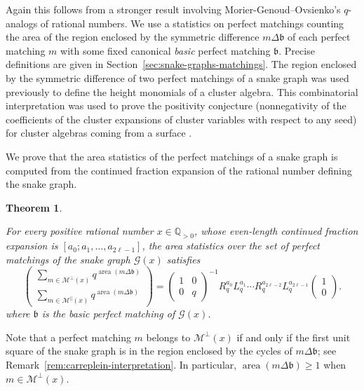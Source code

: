 \documentclass[a4paper,12pt]{amsart}
\newtheorem{maintheorem}{Theorem}
\newcommand{\Q}{\mathbb{Q}}
\newcommand{\xx}{{x}}
\newcommand{\Gcal}{{\mathcal{G}}}
\newcommand{\Mcal}{{\mathcal{M}}}
\newcommand{\bfrak}{{\mathfrak{b}}}
\newcommand{\0}{\mathtt{0}}
\newcommand{\1}{\mathtt{1}}
\newcommand{\2}{\mathtt{2}}
\newcommand{\3}{\mathtt{3}}
\newcommand{\carreplein}{{\perp}}
\newcommand{\carrevide}{{\parallel}}
\DeclareMathOperator{\area}{area}
\begin{document}
Again this follows from a stronger result involving
Morier-Genoud--Ovsienko's $q$-analogs of rational numbers.
We use a statistics on perfect matchings counting
the area of the region enclosed by the symmetric difference $m\Delta\bfrak$
of each perfect matching $m$ with some fixed canonical \emph{basic} perfect
matching $\bfrak$.
Precise definitions are given in Section~\ref{sec:snake-graphs-matchings}.
The region enclosed by the symmetric difference of two perfect matchings of
a snake graph was used previously to define the height monomials of a cluster
algebra.
This combinatorial interpretation was used to prove
the positivity conjecture (nonnegativity of the coefficients of the cluster
expansions of cluster variables with respect to any seed) for cluster algebras
coming from a surface \cite{MR2807089,zbMATH06144657}.

We prove that the area statistics of the perfect matchings of a snake graph
is computed from the continued fraction expansion of the rational number
defining the snake graph.

\newcommand\MainTheoremD{
For every positive rational number $x\in\Q_{>0}$,
whose even-length continued fraction expansion is $[a_0;a_1,\dots,a_{2\ell-1}]$,
the area statistics over the set of perfect matchings
of the snake graph $\Gcal(\xx)$ satisfies
\begin{equation*}
\left(\begin{array}{r}
        \sum_{m\in \Mcal^\carreplein(\xx)} q^{\area(m\Delta\bfrak)}\\
        \sum_{m\in \Mcal^\carrevide (\xx)} q^{\area(m\Delta\bfrak)}
\end{array}\right)
    =
    \left(\begin{smallmatrix} 1 & 0 \\ 0 & q \end{smallmatrix}\right)^{-1}
    R_q^{a_0}L_q^{a_1}\cdots R_q^{a_{2\ell-2}}L_q^{a_{2\ell-1}}
    \left(\begin{smallmatrix} 1 \\ 0 \end{smallmatrix}\right).
\end{equation*}
where $\bfrak$ is the basic perfect matching of $\Gcal(\xx)$.
}


\begin{maintheorem}\label{thm:nice-formula-for-qmatchings}
\MainTheoremD
\end{maintheorem}

Note that a perfect matching $m$ belongs to
$\Mcal^\carreplein(\xx)$ if and only if
the first unit square of the snake graph is in the region
enclosed by the cycles of $m\Delta\bfrak$;
see Remark~\ref{rem:carreplein-interpretation}.
In particular, $\area(m\Delta\bfrak)\geq1$ when $m\in\Mcal^\carreplein(\xx)$.
\end{document}
